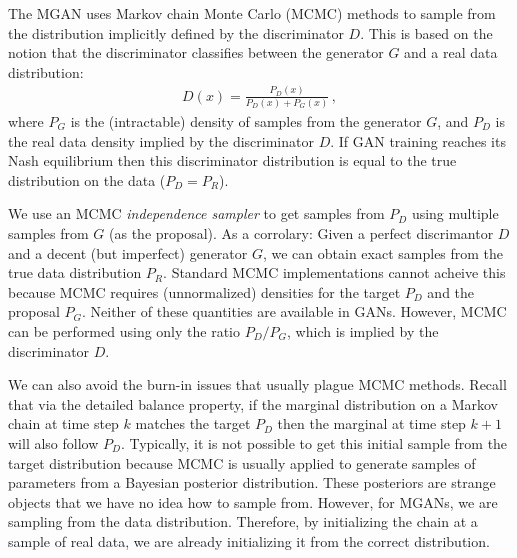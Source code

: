 \documentclass{article}
\begin{document}
The MGAN uses Markov chain Monte Carlo (MCMC) methods to sample from the distribution implicitly defined by the discriminator $D$.
This is based on the notion that the discriminator classifies between the generator $G$ and a real data distribution:
\begin{align}
  D(x) = \frac{P_D(x)}{P_D(x) + P_G(x)}\,,
\end{align}
where $P_G$ is the (intractable) density of samples from the generator $G$, and $P_D$ is the real data density implied by the discriminator $D$.
If GAN training reaches its Nash equilibrium then this discriminator distribution is equal to the true distribution on the data ($P_D = P_R$)\@.  %

We use an MCMC \emph{independence sampler} to get samples from $P_D$ using multiple samples from $G$ (as the proposal)\@.
As a corrolary: Given a perfect discrimantor $D$ and a decent (but imperfect) generator $G$, we can obtain exact samples from the true data distribution $P_R$.
Standard MCMC implementations cannot acheive this because MCMC requires (unnormalized) densities for the target $P_D$ and the proposal $P_G$.
Neither of these quantities are available in GANs.
However, MCMC can be performed using only the ratio $P_D / P_G$, which is implied by the discriminator $D$.

We can also avoid the burn-in issues that usually plague MCMC methods.
Recall that via the detailed balance property, if the marginal distribution on a Markov chain at time step $k$ matches the target $P_D$ then the marginal at time step $k+1$ will also follow $P_D$.
Typically, it is not possible to get this initial sample from the target distribution because MCMC is usually applied to generate samples of parameters from a Bayesian posterior distribution.
These posteriors are strange objects that we have no idea how to sample from.
However, for MGANs, we are sampling from the data distribution.
Therefore, by initializing the chain at a sample of real data, we are already initializing it from the correct distribution.
\end{document}
